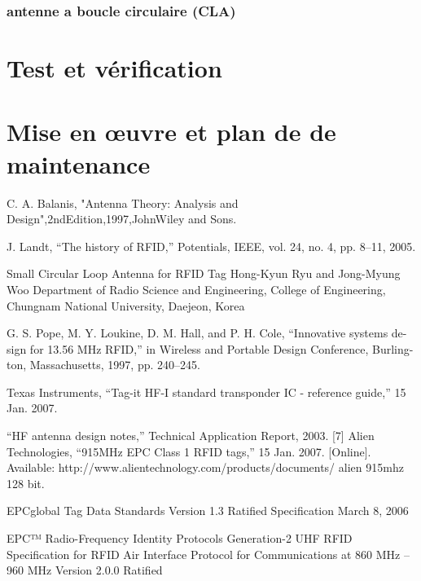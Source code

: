 \documentclass[11pt, a4paper, twoside]{book}
\begin{document}
\subsubsection{antenne a boucle circulaire (CLA)}

\section{Test	 et vérification	}
\section{Mise en	œuvre	 et	plan	de	de maintenance	}
		
\begin{thebibliography}{9}

C. A. Balanis, "Antenna Theory: Analysis and
Design",2ndEdition,1997,JohnWiley and Sons.
 



  J. Landt, “The history of RFID,” Potentials, IEEE, vol. 24, no. 4, pp. 8–11, 2005.

 Small Circular Loop Antenna for RFID Tag
Hong-Kyun Ryu and Jong-Myung Woo
Department of Radio Science and Engineering, College of Engineering, Chungnam National University, Daejeon, Korea

 G. S. Pope, M. Y. Loukine, D. M. Hall, and P. H. Cole, “Innovative systems de- sign for 13.56 MHz RFID,” in Wireless and Portable Design Conference, Burling- ton, Massachusetts, 1997, pp. 240–245.

  Texas Instruments, “Tag-it HF-I standard transponder IC - reference guide,” 15 Jan. 2007. 

  “HF antenna design notes,” Technical Application Report, 2003.
[7] Alien Technologies, “915MHz EPC Class 1 RFID tags,” 15 Jan. 2007. [Online]. Available: http://www.alientechnology.com/products/documents/
alien 915mhz 128 bit.%

  EPCglobal Tag Data Standards Version 1.3 Ratified Specification
March 8, 2006

 EPC™ Radio-Frequency Identity Protocols Generation-2 UHF RFID
Specification for RFID Air Interface Protocol for Communications at 860 MHz – 960 MHz 
Version 2.0.0 Ratified

\end{thebibliography}
\end{document}
